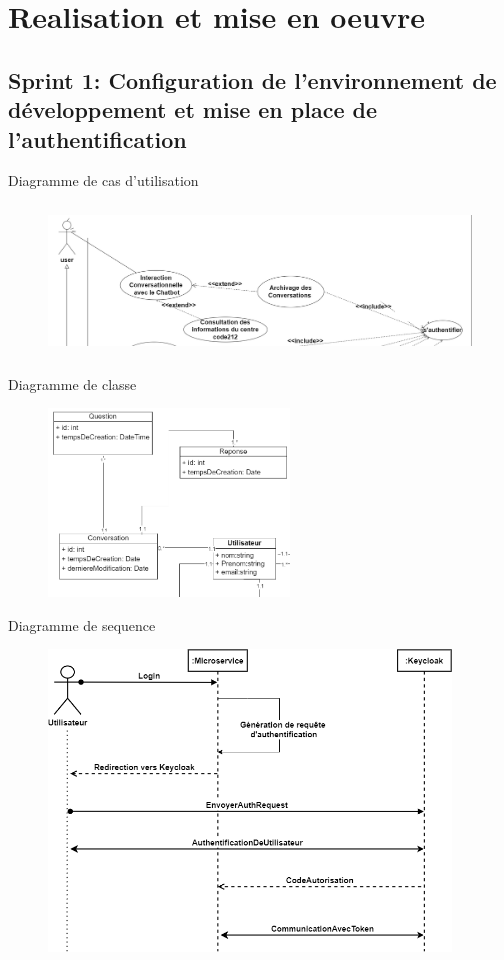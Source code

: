 \section{Realisation et mise en oeuvre}
\subsection{Sprint 1: Configuration de l'environnement de développement et mise en place de l'authentification}
\begin{frame}{Diagramme de cas d'utilisation}

    \begin{figure}[H]
        \centering
        \includegraphics[height=4cm]{assets/images/sprint1-usecase.png}
    \end{figure}
\end{frame}

\begin{frame}{Diagramme de classe}

    \begin{figure}[H]
        \centering
        \includegraphics[height=5cm]{assets/images/sprint1-class.png}
    \end{figure}
\end{frame}

\begin{frame}{Diagramme de sequence}
    \begin{figure}[H]
        \centering
        \includegraphics[height=8cm]{assets/images/keycloak-seq.png}
    \end{figure}
\end{frame}

